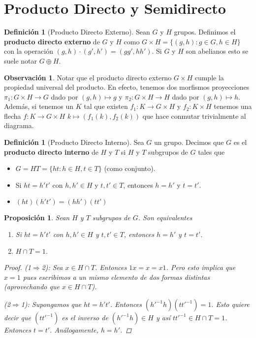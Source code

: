\documentclass[12pt]{book}
\newtheorem{prop}[teo]{Proposición}
\theoremstyle{definition}
\newtheorem{obs}[teo]{Observación}
\newtheorem{defn}[teo]{Definición}
\begin{document}
\section{Producto Directo y Semidirecto}

\begin{defn}[Producto Directo Externo]
Sean $G$ y $H$ grupos. Definimos el \textbf{producto directo externo} de $G$ y $H$ como $G\times H = \{(g,h) : g\in G, h\in H\}$ con la operación $(g,h)\cdot (g',h') = (gg', hh')$. Si $G$ y $H$ son abelianos esto se suele notar $G \oplus H$.
\end{defn}

\begin{obs}
Notar que el producto directo externo $G\times H$ cumple la propiedad universal del producto. En efecto, tenemos dos morfismos proyecciones $\pi_1:G\times H\to G$ dado por $(g,h)\mapsto g$ y $\pi_2 :G\times H\to H$ dado por $(g,h)\mapsto h$. Además, si tenemos un $K$ tal que existen $f_1:K\to G\times H$ y $f_2:K\times H$ tenemos una flecha $f:K\to G\times H$ $k\mapsto (f_1(k),f_2(k))$ que hace conmutar trivialmente al diagrama.
\end{obs}

\begin{defn}[Producto Directo Interno]
Sea $G$ un grupo. Decimos que $G$ es el \textbf{producto directo interno} de $H$ y $T$ si $H$ y $T$ subgrupos de $G$ tales que \begin{itemize}\item $G=HT= \{ht : h\in H, t\in T\}$ (como conjunto). \item Si $ht=h't'$ con $h,h'\in H$ y $t,t'\in T$, entonces $h=h'$ y $t=t'$. \item $(ht)(h't') = (hh')(tt')$ \end{itemize}
\end{defn}

\begin{prop}
Sean $H$ y $T$ subgrupos de $G$. Son equivalentes \begin{enumerate}\item Si $ht=h't'$ con $h,h'\in H$ y $t,t'\in T$, entonces $h=h'$ y $t=t'$. \item $H\cap T = 1$. \end{enumerate}
\begin{proof}
(\textit{1}$\Longrightarrow$\textit{2}): Sea $x\in H\cap T$. Entonces $1x = x = x1$. Pero esto implica que $x=1$ pues escribimos a un mismo elemento de dos formas distintas (aprovechando que $x\in H\cap T$).

(\textit{2}$\Longrightarrow$\textit{1}): Supongamos que $ht=h't'$. Entonces $(h'^{-1}h)(tt'^{-1})=1$. Esto quiere decir que $(tt'^{-1})$ es el inverso de $(h'^{-1}h)\in H$ y así $tt'^{-1}\in H\cap T = 1$. Entonces $t=t'$. Análogamente, $h=h'$.
\end{proof}
\end{prop}
\end{document}
